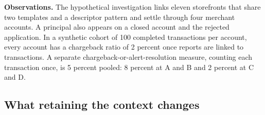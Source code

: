 \documentclass[acmlarge,review,anonymous,nonacm]{acmart}
\begin{document}
\textbf{Observations.} The hypothetical investigation links eleven
storefronts that share two templates and a descriptor pattern and settle
through four merchant accounts. A principal also appears on a closed
account and the rejected application. In a synthetic cohort of 100
completed transactions per account, every account has a chargeback ratio
of 2 percent once reports are linked to transactions. A separate
chargeback-or-alert-resolution measure, counting each transaction once,
is 5 percent pooled: 8 percent at A and B and 2 percent at C and D.

\hypertarget{what-retaining-the-context-changes}{%
\subsection{What retaining the context
changes}\label{what-retaining-the-context-changes}}

\begingroup\footnotesize
\end{document}
